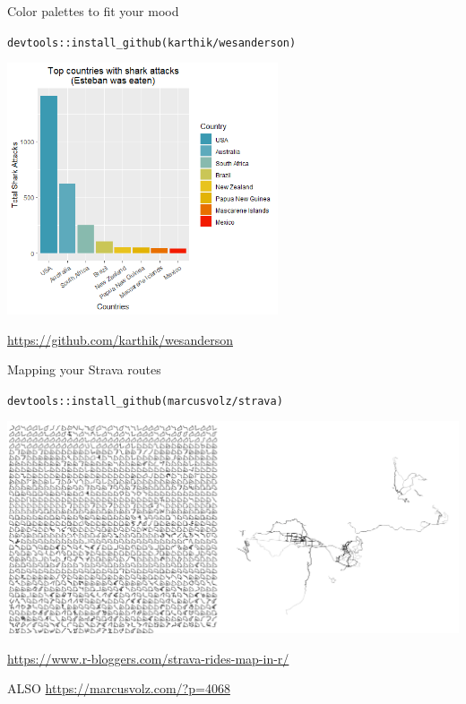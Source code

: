 \documentclass[ignorenonframetext,]{beamer}
\begin{document}
\begin{frame}[fragile]{Color palettes to fit your mood}
\protect\hypertarget{color-palettes-to-fit-your-mood}{}

\texttt{devtools::install\_github(karthik/wesanderson)}

\includegraphics[width=0.6\textwidth,height=\textheight]{../external/images/funR_3_wes_anderson.png}

\url{https://github.com/karthik/wesanderson}

\end{frame}

\begin{frame}[fragile]{Mapping your Strava routes}
\protect\hypertarget{mapping-your-strava-routes}{}

\texttt{devtools::install\_github(marcusvolz/strava)}

\includegraphics{../external/images/funR_4_strava_combo.png}

\url{https://www.r-bloggers.com/strava-rides-map-in-r/}

ALSO \url{https://marcusvolz.com/?p=4068}

\end{frame}
\end{document}
